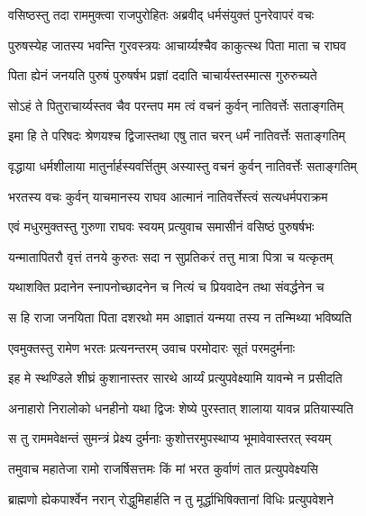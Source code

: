 
\twolineshloka
{वसिष्ठस्तु तदा राममुक्त्वा राजपुरोहितः}
{अब्रवीद् धर्मसंयुक्तं पुनरेवापरं वचः} %

\twolineshloka
{पुरुषस्येह जातस्य भवन्ति गुरवस्त्रयः}
{आचार्य्यश्चैव काकुत्स्थ पिता माता च राघव} %

\twolineshloka
{पिता ह्येनं जनयति पुरुषं पुरुषर्षभ}
{प्रज्ञां ददाति चाचार्यस्तस्मात्स गुरुरुच्यते} %

\twolineshloka
{सोऽहं ते पितुराचार्य्यस्तव चैव परन्तप}
{मम त्वं वचनं कुर्वन् नातिवर्त्तेः सताङ्गतिम्} %

\twolineshloka
{इमा हि ते परिषदः श्रेणयश्च द्विजास्तथा}
{एषु तात चरन् धर्मं नातिवर्त्तेः सताङ्गतिम्} %

\twolineshloka
{वृद्धाया धर्मशीलाया मातुर्नार्हस्यवर्त्तितुम्}
{अस्यास्तु वचनं कुर्वन् नातिवर्त्तेः सताङ्गतिम्} %

\twolineshloka
{भरतस्य वचः कुर्वन् याचमानस्य राघव}
{आत्मानं नातिवर्त्तेस्त्वं सत्यधर्मपराक्रम} %

\twolineshloka
{एवं मधुरमुक्तस्तु गुरुणा राघवः स्वयम्}
{प्रत्युवाच समासीनं वसिष्ठं पुरुषर्षभः} %

\twolineshloka
{यन्मातापितरौ वृत्तं तनये कुरुतः सदा}
{न सुप्रतिकरं तत्तु मात्रा पित्रा च यत्कृतम्} %

\twolineshloka
{यथाशक्ति प्रदानेन स्नापनोच्छादनेन च}
{नित्यं च प्रियवादेन तथा संवर्द्धनेन च} %

\twolineshloka
{स हि राजा जनयिता पिता दशरथो मम}
{आज्ञातं यन्मया तस्य न तन्मिथ्या भविष्यति} %

\twolineshloka
{एवमुक्तस्तु रामेण भरतः प्रत्यनन्तरम्}
{उवाच परमोदारः सूतं परमदुर्मनाः} %

\twolineshloka
{इह मे स्थण्डिले शीघ्रं कुशानास्तर सारथे}
{आर्य्यं प्रत्युपवेक्ष्यामि यावन्मे न प्रसीदति} %

\twolineshloka
{अनाहारो निरालोको धनहीनो यथा द्विजः}
{शेष्ये पुरस्तात् शालाया यावन्न प्रतियास्यति} %

\twolineshloka
{स तु राममवेक्षन्तं सुमन्त्रं प्रेक्ष्य दुर्मनाः}
{कुशोत्तरमुपस्थाप्य भूमावेवास्तरत् स्वयम्} %

\twolineshloka
{तमुवाच महातेजा रामो राजर्षिसत्तमः}
{किं मां भरत कुर्वाणं तात प्रत्युपवेक्ष्यसि} %

\twolineshloka
{ब्राह्मणो ह्येकपार्श्वेन नरान् रोद्धुमिहार्हति}
{न तु मूर्द्धाभिषिक्तानां विधिः प्रत्युपवेशने} %


